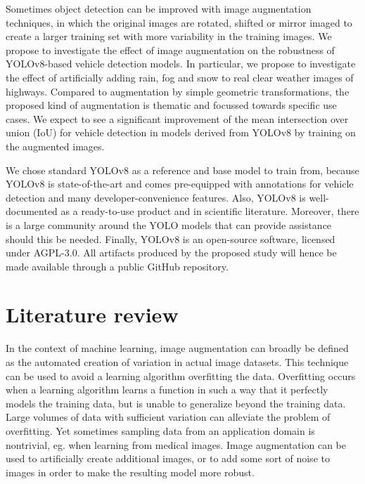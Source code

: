 \documentclass[]{article}
\begin{document}
	Sometimes object detection can be improved with image augmentation techniques, in which the original images are rotated, shifted or mirror imaged to create a larger training set with more variability in the training images.	We propose to investigate the effect of image augmentation on the robustness of YOLO{\small v8}-based vehicle detection models. In particular, we propose to investigate the effect of artificially adding rain, fog and snow to real clear weather images of highways. Compared to augmentation by simple geometric transformations, the proposed kind of augmentation is thematic and focussed towards specific use cases. We expect to see a significant improvement of the mean intersection over union (IoU) for vehicle detection in models derived from YOLO{\small v8} by training on the augmented images. 
	
	We chose standard YOLO{\small v8} as a reference and base model to train from, because YOLO{\small v8} is state-of-the-art and comes pre-equipped with annotations for vehicle detection and many developer-convenience features. Also, YOLO{\small v8} is well-documented as a ready-to-use product and in scientific literature. Moreover, there is a large community around the YOLO models that can provide assistance should this be needed. Finally, YOLO{\small v8} is an open-source software, licensed under AGPL-3.0. All artifacts produced by the proposed study will hence be made available through a public GitHub repository.  

\section{Literature review}

	In the context of machine learning, image augmentation can broadly be defined as the automated creation of variation in actual image datasets. This technique can be used to avoid a learning algorithm overfitting the data. Overfitting occurs when a learning algorithm learns a function in such a way that it perfectly models the training data, but is unable to generalize beyond the training data. Large volumes of data with sufficient variation can alleviate the problem of overfitting. Yet sometimes sampling data from an application domain is nontrivial, eg. when learning from medical images.  Image augmentation can be used to artificially create additional images, or to add some sort of noise to images in order to make the resulting model more robust.
	
\end{document}
